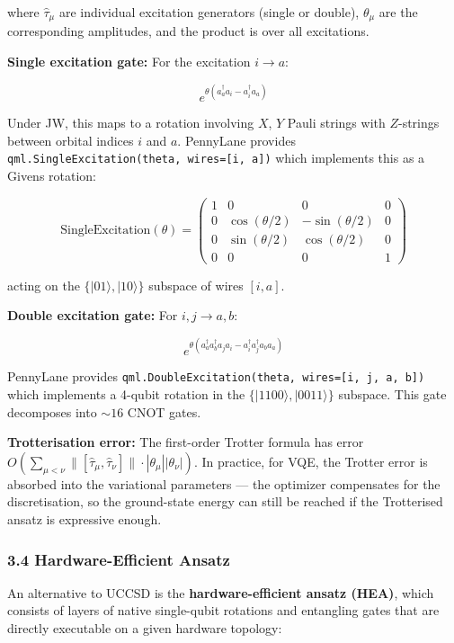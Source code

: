 \documentclass[
  11pt,
]{report}
\begin{document}
where \(\hat{\tau}_\mu\) are individual excitation generators (single or
double), \(\theta_\mu\) are the corresponding amplitudes, and the
product is over all excitations.

\textbf{Single excitation gate:} For the excitation \(i \to a\):

\[e^{\theta(a_a^\dagger a_i - a_i^\dagger a_a)}\]

Under JW, this maps to a rotation involving \(X\), \(Y\) Pauli strings
with \(Z\)-strings between orbital indices \(i\) and \(a\). PennyLane
provides \texttt{qml.SingleExcitation(theta,\ wires={[}i,\ a{]})} which
implements this as a Givens rotation:

\[\text{SingleExcitation}(\theta) = \begin{pmatrix} 1 & 0 & 0 & 0 \\ 0 & \cos(\theta/2) & -\sin(\theta/2) & 0 \\ 0 & \sin(\theta/2) & \cos(\theta/2) & 0 \\ 0 & 0 & 0 & 1 \end{pmatrix}\]

acting on the \(\{|01\rangle, |10\rangle\}\) subspace of wires
\([i, a]\).

\textbf{Double excitation gate:} For \(i, j \to a, b\):

\[e^{\theta(a_a^\dagger a_b^\dagger a_j a_i - a_i^\dagger a_j^\dagger a_b a_a)}\]

PennyLane provides
\texttt{qml.DoubleExcitation(theta,\ wires={[}i,\ j,\ a,\ b{]})} which
implements a 4-qubit rotation in the \(\{|1100\rangle, |0011\rangle\}\)
subspace. This gate decomposes into \(\sim 16\) CNOT gates.

\textbf{Trotterisation error:} The first-order Trotter formula has error
\(O(\sum_{\mu < \nu} \|[\hat{\tau}_\mu, \hat{\tau}_\nu]\| \cdot |\theta_\mu||\theta_\nu|)\).
In practice, for VQE, the Trotter error is absorbed into the variational
parameters --- the optimizer compensates for the discretisation, so the
ground-state energy can still be reached if the Trotterised ansatz is
expressive enough.

\subsubsection{3.4 Hardware-Efficient
Ansatz}\label{hardware-efficient-ansatz}

An alternative to UCCSD is the \textbf{hardware-efficient ansatz (HEA)},
which consists of layers of native single-qubit rotations and entangling
gates that are directly executable on a given hardware topology:
\end{document}
